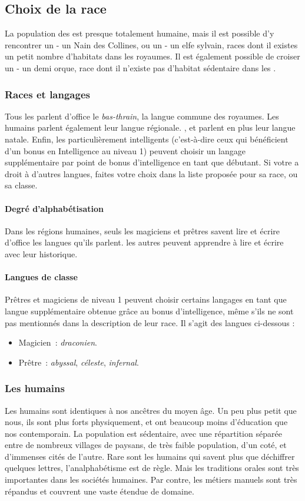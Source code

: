 \documentclass[a4paper,10pt,openany]{book}
\begin{document}
\begin{multicols}{2}
\subsection{Choix de la race}
La population des \Royaumes est presque totalement humaine, mais il est possible d’y rencontrer un \Nain - un Nain des Collines, ou un \Elfe - un elfe
sylvain, races dont il existes un petit nombre d’habitats dans les royaumes. Il est également possible de croiser un \DemiOrc - un demi orque, race
dont il n’existe pas d’habitat sédentaire dans les \Royaumes.

\subsubsection{Races et langages}
Tous les \PJs parlent d’office le \emph{bas-thrain}, la langue commune des royaumes. Les humains parlent également leur langue régionale.
\Elfes, \Nains et \DemiOrcs parlent en plus leur langue natale. Enfin, les \PJs particulièrement intelligents (c’est-à-dire ceux qui bénéficient d’un
bonus en Intelligence au niveau 1) peuvent choisir un langage supplémentaire par point de bonus d’intelligence en tant que \PJ débutant. Si votre \PJ
a droit à d’autres langues, faites votre choix dans la liste proposée pour sa race, ou sa classe.
\paragraph{Degré d’alphabétisation}
Dans les régions humaines, seuls les \PJs magiciens et prêtres savent lire et écrire d’office les langues qu’ils parlent. les autres \PJs peuvent
apprendre à lire et écrire avec leur historique.
\paragraph{Langues de classe}
Prêtres et magiciens de niveau 1 peuvent choisir certains langages en tant que langue supplémentaire obtenue grâce au bonus d’intelligence, même s’ils
ne sont pas mentionnés dans la description de leur race. Il s’agit des langues ci-dessous :
\begin{itemize}
  \item Magicien : \emph{draconien}.
  \item Prêtre : \emph{abyssal}, \emph{céleste}, \emph{infernal}.
\end{itemize}

\subsubsection{Les humains}
Les humains sont identiques à nos ancêtres du moyen âge. Un peu plus petit que nous, ils sont plus forts physiquement, et ont beaucoup moins
d’éducation que nos contemporain. La population est sédentaire, avec une répartition séparée entre de nombreux villages de paysans, de très faible
population, d’un coté, et d’immenses cités de l’autre. Rare sont les humains qui savent plus que déchiffrer quelques lettres, l’analphabétisme est de
règle. Mais les traditions orales sont très importantes dans les sociétés humaines. Par contre, les métiers manuels sont très répandus et couvrent une
vaste étendue de domaine.

\end{multicols}
\end{document}
